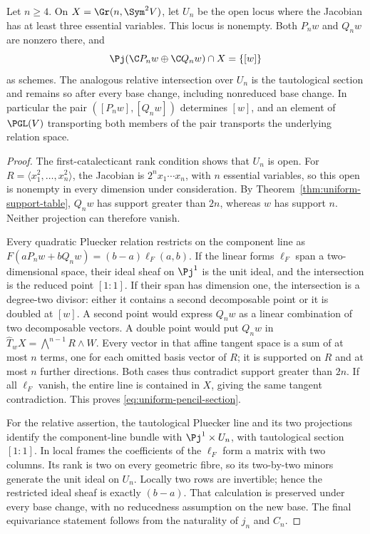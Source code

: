 \begin{theorem}
\label{thm:uniform-recombination}
Let \(n\ge4\).  On \(X=\Gr(n,\Sym^2V)\), let \(U_n\) be the
open locus where the Jacobian has at least three essential variables.
This locus is nonempty.  Both \(P_nw\) and \(Q_nw\) are nonzero
there, and
\begin{equation}\label{eq:uniform-pencil-section}
 \Pj(\C P_nw\oplus\C Q_nw)\cap X=\{[w]\}
\end{equation}
as schemes.  The analogous relative intersection over \(U_n\)
is the tautological section and remains so after every base change,
including nonreduced base change.  In particular the pair
\(([P_nw],[Q_nw])\) determines \([w]\), and an element of
\(\PGL(V)\) transporting both members of the pair transports the
underlying relation space.
\end{theorem}
\begin{proof}
The first-catalecticant rank condition shows that \(U_n\) is open.
For \(R=\langle x_1^2,\ldots,x_n^2\rangle\), the Jacobian is
\(2^n x_1\cdots x_n\), with \(n\) essential variables, so this
open is nonempty in every dimension under consideration.
By Theorem~\ref{thm:uniform-support-table}, \(Q_nw\) has support
greater than \(2n\), whereas \(w\) has support \(n\).
Neither projection can therefore vanish.

Every quadratic Pluecker relation restricts on the component line as
\(F(aP_nw+bQ_nw)=(b-a)\ell_F(a,b)\).  If the linear forms
\(\ell_F\) span a two-dimensional space, their ideal sheaf on
\(\Pj^1\) is the unit ideal, and the intersection is the reduced
point \([1:1]\).  If their span has dimension one, the intersection
is a degree-two divisor: either it contains a second decomposable
point or it is doubled at \([w]\).  A second point would express
\(Q_nw\) as a linear combination of two decomposable vectors.
A double point would put \(Q_nw\) in
\(\widehat T_wX=\bigwedge^{n-1}R\wedge W\).
Every vector in that affine tangent space is a sum of at most \(n\)
terms, one for each omitted basis vector of \(R\); it is supported
on \(R\) and at most \(n\) further directions.  Both cases thus
contradict support greater than \(2n\).  If all \(\ell_F\) vanish,
the entire line is contained in \(X\), giving the same tangent
contradiction.  This proves \eqref{eq:uniform-pencil-section}.

For the relative assertion, the tautological Pluecker line and its
two projections identify the component-line bundle with
\(\Pj^1\times U_n\), with tautological section \([1:1]\).
In local frames the coefficients of the \(\ell_F\) form a
matrix with two columns.  Its rank is two on every geometric fibre,
so its two-by-two minors generate the unit ideal on \(U_n\).
Locally two rows are invertible; hence the restricted ideal sheaf
is exactly \((b-a)\).  That calculation is preserved under every
base change, with no reducedness assumption on the new base.
The final equivariance statement follows from the naturality of
\(j_n\) and \(C_n\).
\end{proof}

